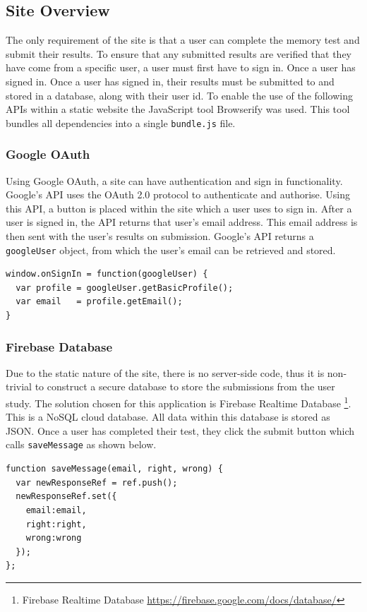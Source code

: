 \documentclass[a4paper, openright, twoside]{report}
\begin{document}
\subsection{Site Overview}
The only requirement of the site is that a user can complete the memory test and submit their results. To ensure that any submitted results are verified that they have come from a specific user, a user must first have to sign in. Once a user has signed in. Once a user has signed in, their results must be submitted to and stored in a database, along with their user id. To enable the use of the following APIs within a static website the JavaScript tool Browserify was used. This tool bundles all dependencies into a single \lstinline{bundle.js} file.  

\subsubsection{Google OAuth}
Using Google OAuth, a site can have authentication and sign in functionality. Google's API uses the OAuth 2.0 protocol to authenticate and authorise. Using this API, a button is placed within the site which a user uses to sign in. After a user is signed in, the API returns that user's email address. This email address is then sent with the user's results on submission. Google's API returns a \lstinline{googleUser} object, from which the user's email can be retrieved and stored. 
\\
\begin{lstlisting}
window.onSignIn = function(googleUser) {
  var profile = googleUser.getBasicProfile();
  var email   = profile.getEmail();
}
\end{lstlisting}

\subsubsection{Firebase Database}
Due to the static nature of the site, there is no server-side code, thus it is non-trivial to construct a secure database to store the submissions from the user study. The solution chosen for this application is Firebase Realtime Database \footnote{Firebase Realtime Database \url{https://firebase.google.com/docs/database/}}. This is a NoSQL cloud database. All data within this database is stored as JSON. Once a user has completed their test, they click the submit button which calls \lstinline{saveMessage} as shown below.
\\
\begin{lstlisting}
function saveMessage(email, right, wrong) {
  var newResponseRef = ref.push();
  newResponseRef.set({
    email:email,
    right:right,
    wrong:wrong
  });
};
\end{lstlisting}
\end{document}
